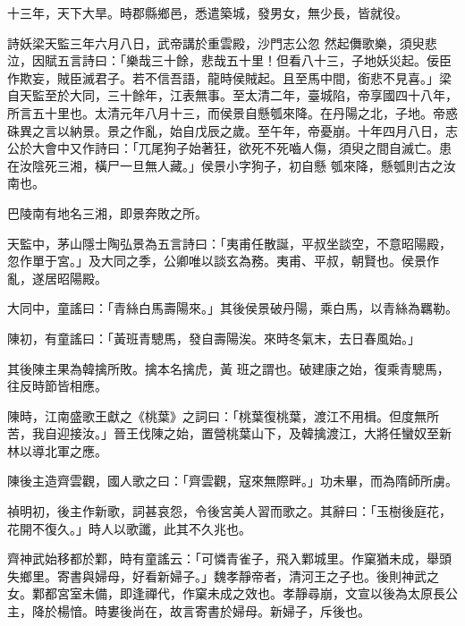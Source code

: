 \begin{pinyinscope}
 十三年，天下大旱。時郡縣鄉邑，悉遣築城，發男女，無少長，皆就役。



 詩妖梁天監三年六月八日，武帝講於重雲殿，沙門志公忽
 然起儛歌樂，須臾悲泣，因賦五言詩曰：「樂哉三十餘，悲哉五十里！但看八十三，子地妖災起。佞臣作欺妄，賊臣滅君子。若不信吾語，龍時侯賊起。且至馬中間，銜悲不見喜。」梁自天監至於大同，三十餘年，江表無事。至太清二年，臺城陷，帝享國四十八年，所言五十里也。太清元年八月十三，而侯景自懸瓠來降。在丹陽之北，子地。帝惑硃異之言以納景。景之作亂，始自戊辰之歲。至午年，帝憂崩。十年四月八日，志公於大會中又作詩曰：「兀尾狗子始著狂，欲死不死嚙人傷，須臾之間自滅亡。患在汝陰死三湘，橫尸一旦無人藏。」侯景小字狗子，初自懸
 瓠來降，懸瓠則古之汝南也。



 巴陵南有地名三湘，即景奔敗之所。



 天監中，茅山隱士陶弘景為五言詩曰：「夷甫任散誕，平叔坐談空，不意昭陽殿，忽作單于宮。」及大同之季，公卿唯以談玄為務。夷甫、平叔，朝賢也。侯景作亂，遂居昭陽殿。



 大同中，童謠曰：「青絲白馬壽陽來。」其後侯景破丹陽，乘白馬，以青絲為羈勒。



 陳初，有童謠曰：「黃班青驄馬，發自壽陽涘。來時冬氣末，去日春風始。」



 其後陳主果為韓擒所敗。擒本名擒虎，黃
 班之謂也。破建康之始，復乘青驄馬，往反時節皆相應。



 陳時，江南盛歌王獻之《桃葉》之詞曰：「桃葉復桃葉，渡江不用楫。但度無所苦，我自迎接汝。」晉王伐陳之始，置營桃葉山下，及韓擒渡江，大將任蠻奴至新林以導北軍之應。



 陳後主造齊雲觀，國人歌之曰：「齊雲觀，寇來無際畔。」功未畢，而為隋師所虜。



 禎明初，後主作新歌，詞甚哀怨，令後宮美人習而歌之。其辭曰：「玉樹後庭花，花開不復久。」時人以歌讖，此其不久兆也。



 齊神武始移都於鄴，時有童謠云：「可憐青雀子，飛入鄴城里。作窠猶未成，舉頭失鄉里。寄書與婦母，好看新婦子。」魏孝靜帝者，清河王之子也。後則神武之女。鄴都宮室未備，即逢禪代，作窠未成之效也。孝靜尋崩，文宣以後為太原長公主，降於楊愔。時婁後尚在，故言寄書於婦母。新婦子，斥後也。




\end{pinyinscope}

